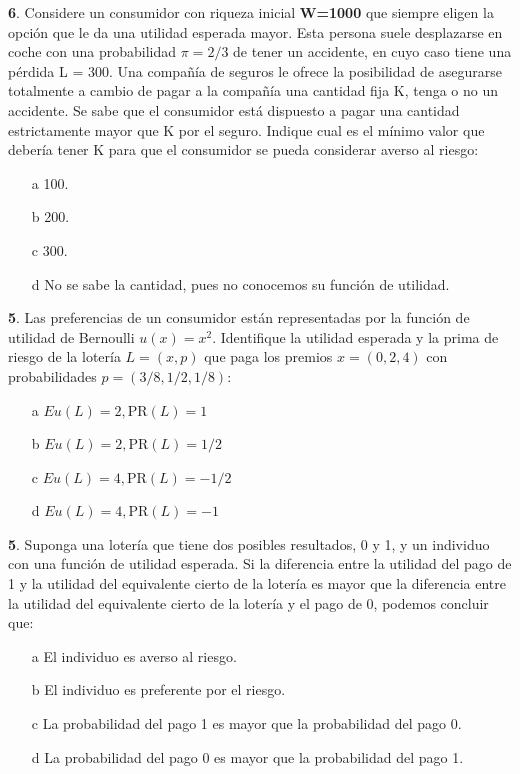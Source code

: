 \documentclass{nuevotema}
\begin{document}

\textbf{6}. Considere un consumidor con riqueza inicial \textbf{W=1000} que siempre eligen la opción que le da una utilidad esperada mayor. Esta persona suele desplazarse en coche con una probabilidad $\pi = 2/3$ de tener un accidente, en cuyo caso tiene una pérdida L = 300. Una compañía de seguros le ofrece la posibilidad de asegurarse totalmente a cambio de pagar a la compañía una cantidad fija K, tenga o no un accidente. Se sabe que el consumidor está dispuesto a pagar una cantidad estrictamente mayor que K por el seguro. Indique cual es el mínimo valor que debería tener K para que el consumidor se pueda considerar averso al riesgo:

\begin{enumerate}
	\item[a] 100.
	\item[b] 200.
	\item[c] 300.
	\item[d] No se sabe la cantidad, pues no conocemos su función de utilidad.
\end{enumerate}


\textbf{5}. Las preferencias de un consumidor están representadas por la función de utilidad de Bernoulli $u(x) = x^2$. Identifique la utilidad esperada y la prima de riesgo de la lotería $L=(x,p)$ que paga los premios $x=(0, 2, 4)$ con probabilidades $p = (3/8, 1/2, 1/8)$:

\begin{enumerate}
	\item[a] $Eu(L) = 2, \text{PR}(L) = 1$
	\item[b] $Eu(L) = 2, \text{PR}(L) = 1/2$
	\item[c] $Eu(L) = 4, \text{PR}(L) = -1/2$
	\item[d] $Eu(L) = 4, \text{PR}(L) = -1$
\end{enumerate}


\textbf{5}. Suponga una lotería que tiene dos posibles resultados, 0 y 1, y un individuo con una función de utilidad esperada. Si la diferencia entre la utilidad del pago de 1 y la utilidad del equivalente cierto de la lotería es mayor que la diferencia entre la utilidad del equivalente cierto de la lotería y el pago de 0, podemos concluir que:
\begin{enumerate}
	\item[a] El individuo es averso al riesgo.
	\item[b] El individuo es preferente por el riesgo.
	\item[c] La probabilidad del pago 1 es mayor que la probabilidad del pago 0.
	\item[d] La probabilidad del pago 0 es mayor que la probabilidad del pago 1.
\end{enumerate}
\end{document}
